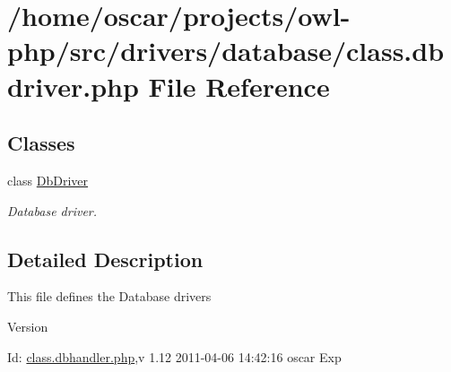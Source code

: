 \section{/home/oscar/projects/owl-\/php/src/drivers/database/class.dbdriver.php File Reference}
\label{class_8dbdriver_8php}
\subsection*{Classes}
\begin{DoxyCompactItemize}
\item 
class \hyperlink{classDbDriver}{DbDriver}
\begin{DoxyCompactList}\small\item\em Database driver. \item\end{DoxyCompactList}\end{DoxyCompactItemize}


\subsection{Detailed Description}
This file defines the Database drivers \begin{DoxyVersion}{Version}

\end{DoxyVersion}
\begin{DoxyParagraph}{Id:}
\hyperlink{class_8dbhandler_8php}{class.dbhandler.php},v 1.12 2011-\/04-\/06 14:42:16 oscar Exp 
\end{DoxyParagraph}
